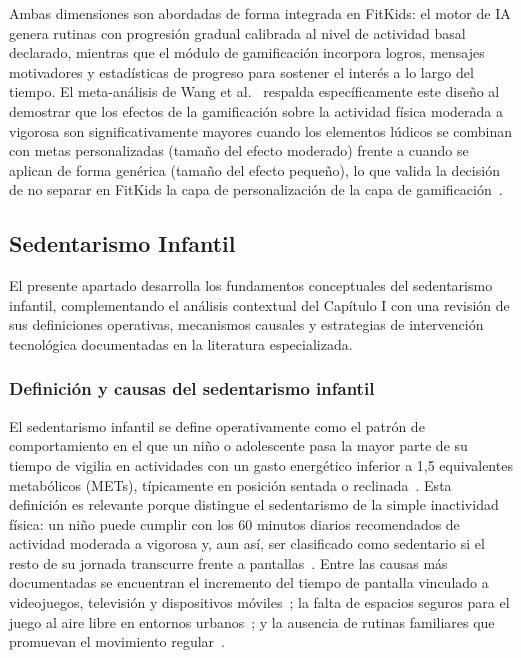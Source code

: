 				Ambas dimensiones son abordadas de forma integrada en FitKids: el motor de IA genera rutinas con progresión gradual calibrada al nivel de actividad basal declarado, mientras que el módulo de gamificación incorpora logros, mensajes motivadores y estadísticas de progreso para sostener el interés a lo largo del tiempo. El meta-análisis de Wang et al.~\cite{WangGamif2025} respalda específicamente este diseño al demostrar que los efectos de la gamificación sobre la actividad física moderada a vigorosa son significativamente mayores cuando los elementos lúdicos se combinan con metas personalizadas (tamaño del efecto moderado) frente a cuando se aplican de forma genérica (tamaño del efecto pequeño), lo que valida la decisión de no separar en FitKids la capa de personalización de la capa de gamificación~\cite{WangGamif2025}.

			\subsection{Sedentarismo Infantil}
				El presente apartado desarrolla los fundamentos conceptuales del sedentarismo infantil, complementando el análisis contextual del Capítulo I con una revisión de sus definiciones operativas, mecanismos causales y estrategias de intervención tecnológica documentadas en la literatura especializada.

				\subsubsection{Definición y causas del sedentarismo infantil}
					El sedentarismo infantil se define operativamente como el patrón de comportamiento en el que un niño o adolescente pasa la mayor parte de su tiempo de vigilia en actividades con un gasto energético inferior a 1,5 equivalentes metabólicos (METs), típicamente en posición sentada o reclinada~\cite{Wilhite2023}. Esta definición es relevante porque distingue el sedentarismo de la simple inactividad física: un niño puede cumplir con los 60 minutos diarios recomendados de actividad moderada a vigorosa y, aun así, ser clasificado como sedentario si el resto de su jornada transcurre frente a pantallas~\cite{Bull2020}. Entre las causas más documentadas se encuentran el incremento del tiempo de pantalla vinculado a videojuegos, televisión y dispositivos móviles~\cite{Musa2022}; la falta de espacios seguros para el juego al aire libre en entornos urbanos~\cite{Hesketh2017}; y la ausencia de rutinas familiares que promuevan el movimiento regular~\cite{VegaDiaz2023}.
					
